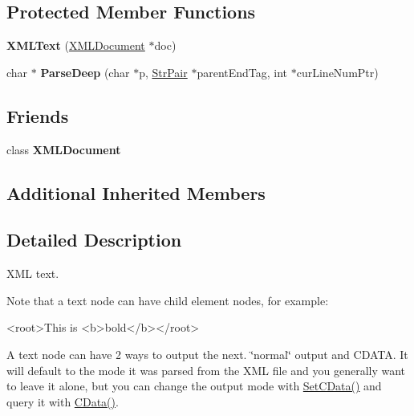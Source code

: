 \subsection*{Protected Member Functions}
\begin{DoxyCompactItemize}
\item 
\mbox{\label{classCPlantBox_1_1tinyxml2_1_1XMLText_add552b0e9390991e3ef47dea401d5ebd}} 
{\bfseries X\+M\+L\+Text} (\hyperlink{classCPlantBox_1_1tinyxml2_1_1XMLDocument}{X\+M\+L\+Document} $\ast$doc)
\item 
\mbox{\label{classCPlantBox_1_1tinyxml2_1_1XMLText_a2e6526e559a766725547a54e99ff323a}} 
char $\ast$ {\bfseries Parse\+Deep} (char $\ast$p, \hyperlink{classCPlantBox_1_1tinyxml2_1_1StrPair}{Str\+Pair} $\ast$parent\+End\+Tag, int $\ast$cur\+Line\+Num\+Ptr)
\end{DoxyCompactItemize}
\subsection*{Friends}
\begin{DoxyCompactItemize}
\item 
\mbox{\label{classCPlantBox_1_1tinyxml2_1_1XMLText_a4eee3bda60c60a30e4e8cd4ea91c4c6e}} 
class {\bfseries X\+M\+L\+Document}
\end{DoxyCompactItemize}
\subsection*{Additional Inherited Members}


\subsection{Detailed Description}
X\+ML text.

Note that a text node can have child element nodes, for example\+: \begin{DoxyVerb}<root>This is <b>bold</b></root>
\end{DoxyVerb}


A text node can have 2 ways to output the next. \char`\"{}normal\char`\"{} output and C\+D\+A\+TA. It will default to the mode it was parsed from the X\+ML file and you generally want to leave it alone, but you can change the output mode with \hyperlink{classCPlantBox_1_1tinyxml2_1_1XMLText_a4eefa3dcef86a405028538544d104d48}{Set\+C\+Data()} and query it with \hyperlink{classCPlantBox_1_1tinyxml2_1_1XMLText_a95333bfa2ea97b7d58e915e0919ffb04}{C\+Data()}. 

